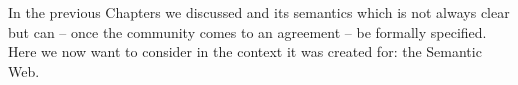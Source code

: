 In the previous Chapters we discussed \nthreelogic and its semantics which is not always clear but can -- once the community comes to an agreement -- be formally specified. 
Here we now want to consider \nthreelogic in the context it was created for: the Semantic Web. 